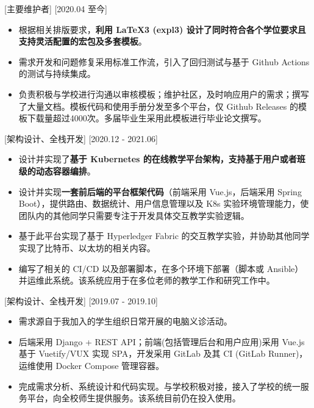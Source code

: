 \documentclass{resume}
\begin{document}
[主要维护者]
[2020.04 至今]

\begin{itemize}
  \item 根据相关排版要求，\textbf{利用 LaTeX3 (expl3) 设计了同时符合各个学位要求且支持灵活配置的宏包及多套模板}。
  \item 需求开发和问题修复采用标准工作流，引入了回归测试与基于 Github Actions 的测试与持续集成。
  \item 负责积极与学校进行沟通以审核模板；维护社区，及时响应用户的需求；撰写了大量文档。模板代码和使用手册分发至多个平台，仅 Github Releases 的模板下载量超过4000次。多届毕业生采用此模板进行毕业论文撰写。
\end{itemize}


[架构设计、全栈开发]
[2020.12 - 2021.06] 

\begin{itemize}
  \item 设计并实现了\textbf{基于 Kubernetes 的在线教学平台架构，支持基于用户或者班级的动态容器编排}。
  \item 设计并实现\textbf{一套前后端的平台框架代码}（前端采用 Vue.js，后端采用 Spring Boot），提供路由、数据统计、用户信息管理以及 K8s 实验环境管理能力，使团队内的其他同学只需要专注于开发具体交互教学实验逻辑。
  \item 基于此平台实现了基于 Hyperledger Fabric 的交互教学实验，并协助其他同学实现了比特币、以太坊的相关内容。
  \item 编写了相关的 CI/CD 以及部署脚本，在多个环境下部署（脚本或 Ansible）并运维此系统。该系统应用于在多位老师的教学工作和研究工作中。
\end{itemize}

[架构设计、全栈开发]
[2019.07 - 2019.10] 

\begin{itemize}
  \item 需求源自于我加入的学生组织日常开展的电脑义诊活动。
  \item 后端采用 Django + REST API；前端(包括管理后台和用户应用)采用 Vue.js 基于 Vuetify/VUX 实现 SPA，开发采用 GitLab 及其 CI (GitLab Runner)，运维使用 Docker Compose 管理容器。
  \item 完成需求分析、系统设计和代码实现。与学校积极对接，接入了学校的统一服务平台，向全校师生提供服务。该系统目前仍在投入使用。
\end{itemize}
\end{document}
